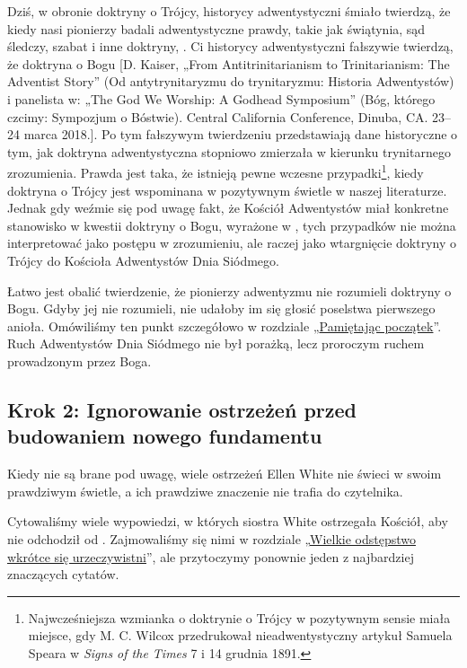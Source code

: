 Dziś, w obronie doktryny o Trójcy, historycy adwentystyczni śmiało twierdzą, że kiedy nasi pionierzy badali adwentystyczne prawdy, takie jak świątynia, sąd śledczy, szabat i inne doktryny, . Ci historycy adwentystyczni fałszywie twierdzą, że doktryna o Bogu [D. Kaiser, „From Antitrinitarianism to Trinitarianism: The Adventist Story” (Od antytrynitaryzmu do trynitaryzmu: Historia Adwentystów) i panelista w: „The God We Worship: A Godhead Symposium” (Bóg, którego czcimy: Sympozjum o Bóstwie). Central California Conference, Dinuba, CA. 23--24 marca 2018.]. Po tym fałszywym twierdzeniu przedstawiają dane historyczne o tym, jak doktryna adwentystyczna stopniowo zmierzała w kierunku trynitarnego zrozumienia. Prawda jest taka, że istnieją pewne wczesne przypadki\footnote{Najwcześniejsza wzmianka o doktrynie o Trójcy w pozytywnym sensie miała miejsce, gdy M. C. Wilcox przedrukował nieadwentystyczny artykuł Samuela Speara w \textit{Signs of the Times} 7 i 14 grudnia 1891.}, kiedy doktryna o Trójcy jest wspominana w pozytywnym świetle w naszej literaturze. Jednak gdy weźmie się pod uwagę fakt, że Kościół Adwentystów miał konkretne stanowisko w kwestii doktryny o Bogu, wyrażone w , tych przypadków nie można interpretować jako postępu w zrozumieniu, ale raczej jako wtargnięcie doktryny o Trójcy do Kościoła Adwentystów Dnia Siódmego.

Łatwo jest obalić twierdzenie, że pionierzy adwentyzmu nie rozumieli doktryny o Bogu. Gdyby jej nie rozumieli, nie udałoby im się głosić poselstwa pierwszego anioła. Omówiliśmy ten punkt szczegółowo w rozdziale „\hyperref[chap:remembering-the-beginning]{Pamiętając początek}”. Ruch Adwentystów Dnia Siódmego nie był porażką, lecz proroczym ruchem prowadzonym przez Boga.

\subsection*{Krok 2: Ignorowanie ostrzeżeń przed budowaniem nowego fundamentu}

Kiedy  nie są brane pod uwagę, wiele ostrzeżeń Ellen White nie świeci w swoim prawdziwym świetle, a ich prawdziwe znaczenie nie trafia do czytelnika.

Cytowaliśmy wiele wypowiedzi, w których siostra White ostrzegała Kościół, aby nie odchodził od . Zajmowaliśmy się nimi w rozdziale „\hyperref[chap:apostasy]{Wielkie odstępstwo wkrótce się urzeczywistni}”, ale przytoczymy ponownie jeden z najbardziej znaczących cytatów.


